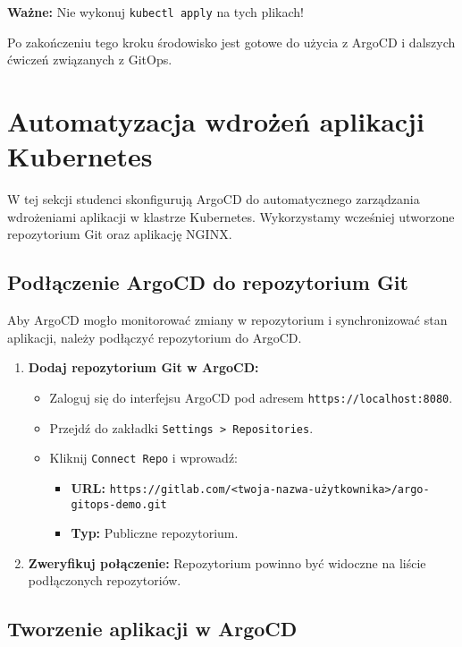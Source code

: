 \documentclass{article}
\begin{document}
\textbf{Ważne:} Nie wykonuj \texttt{kubectl apply} na tych plikach!

Po zakończeniu tego kroku środowisko jest gotowe do użycia z ArgoCD i dalszych ćwiczeń związanych z GitOps.

\section{Automatyzacja wdrożeń aplikacji Kubernetes}

W tej sekcji studenci skonfigurują ArgoCD do automatycznego zarządzania wdrożeniami aplikacji w klastrze Kubernetes. Wykorzystamy wcześniej utworzone repozytorium Git oraz aplikację NGINX.

\subsection{Podłączenie ArgoCD do repozytorium Git}

Aby ArgoCD mogło monitorować zmiany w repozytorium i synchronizować stan aplikacji, należy podłączyć repozytorium do ArgoCD.

\begin{enumerate}
    \item \textbf{Dodaj repozytorium Git w ArgoCD:}
    \begin{itemize}
        \item Zaloguj się do interfejsu ArgoCD pod adresem \texttt{https://localhost:8080}.
        \item Przejdź do zakładki \texttt{Settings > Repositories}.
        \item Kliknij \texttt{Connect Repo} i wprowadź:
            \begin{itemize}
                \item \textbf{URL:} \texttt{https://gitlab.com/<twoja-nazwa-użytkownika>/argo-gitops-demo.git}
                \item \textbf{Typ:} Publiczne repozytorium.
            \end{itemize}
    \end{itemize}
    
    \item \textbf{Zweryfikuj połączenie:} Repozytorium powinno być widoczne na liście podłączonych repozytoriów.
\end{enumerate}

\subsection{Tworzenie aplikacji w ArgoCD}
\end{document}
